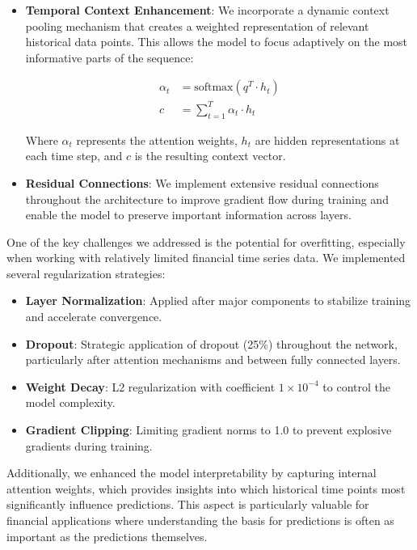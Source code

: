 \documentclass[conference]{IEEEtran}
\begin{document}
\begin{itemize}
\item \textbf{Temporal Context Enhancement}: We incorporate a dynamic context pooling mechanism that creates a weighted representation of relevant historical data points. This allows the model to focus adaptively on the most informative parts of the sequence:

\begin{equation}
\begin{aligned}
\alpha_t &= \text{softmax}(q^T \cdot h_t) \\
c &= \sum_{t=1}^{T} \alpha_t \cdot h_t
\end{aligned}
\end{equation}

Where $\alpha_t$ represents the attention weights, $h_t$ are hidden representations at each time step, and $c$ is the resulting context vector.

\item \textbf{Residual Connections}: We implement extensive residual connections throughout the architecture to improve gradient flow during training and enable the model to preserve important information across layers.
\end{itemize}

One of the key challenges we addressed is the potential for overfitting, especially when working with relatively limited financial time series data. We implemented several regularization strategies:

\begin{itemize}
\item \textbf{Layer Normalization}: Applied after major components to stabilize training and accelerate convergence.

\item \textbf{Dropout}: Strategic application of dropout (25\%) throughout the network, particularly after attention mechanisms and between fully connected layers.

\item \textbf{Weight Decay}: L2 regularization with coefficient $1 \times 10^{-4}$ to control the model complexity.

\item \textbf{Gradient Clipping}: Limiting gradient norms to 1.0 to prevent explosive gradients during training.
\end{itemize}

Additionally, we enhanced the model interpretability by capturing internal attention weights, which provides insights into which historical time points most significantly influence predictions. This aspect is particularly valuable for financial applications where understanding the basis for predictions is often as important as the predictions themselves.
\end{document}
